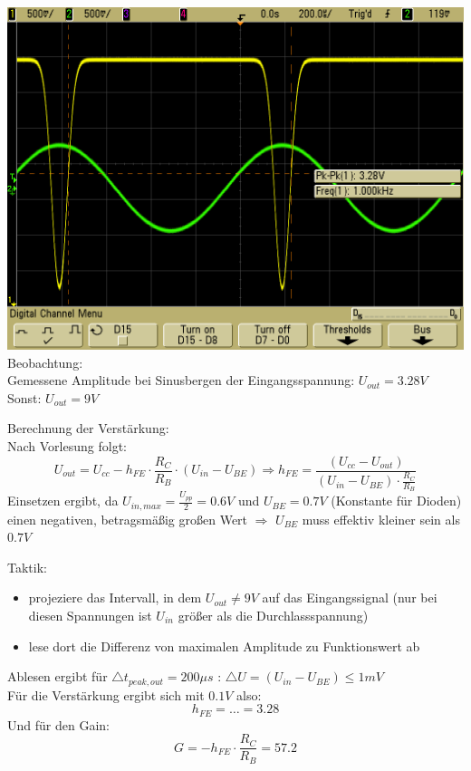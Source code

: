 \documentclass[compress,11pt]{beamer}
\begin{document}
\begin{frame}

\includegraphics[width=.7\textwidth]{../daten/oszi/scope_45}\\
Beobachtung:\\
Gemessene Amplitude bei Sinusbergen der Eingangsspannung: $U_{out} = 3.28 V$\\
Sonst: $U_{out} = 9 V$
\end{frame}
\begin{frame}
Berechnung der Verstärkung:\\
Nach Vorlesung folgt:
\begin{equation}
U_{out} = U_{cc} - h_{FE} \cdot \frac{R_C}{R_B} \cdot (U_{in} - U_{BE}) \Rightarrow h_{FE} = \frac{(U_{cc} - U_{out})}{(U_{in} - U_{BE}) \cdot \frac{R_C}{R_B}}
\end{equation}
Einsetzen ergibt, da $U_{in,max} = \frac{U_{pp}}{2} = 0.6 V$ und $U_{BE} = 0.7 V$ (Konstante für Dioden) einen negativen, betragsmäßig großen Wert $\Rightarrow$ $U_{BE}$ muss effektiv kleiner sein als $0.7 V$\\
\end{frame}
\begin{frame}

Taktik:
\begin{itemize}
\item projeziere das Intervall, in dem $U_{out} \neq 9 V$ auf das Eingangssignal (nur bei diesen Spannungen ist $U_{in}$ größer als die Durchlassspannung)
\item lese dort die Differenz von maximalen Amplitude zu Funktionswert ab
\end{itemize}


\end{frame}
\begin{frame}
Ablesen ergibt für $\bigtriangleup t_{peak,out} = 200 \mu s$ : $\bigtriangleup U = (U_{in} - U_{BE}) \leq 1 mV$ \\ Für die Verstärkung ergibt sich mit $0.1 V$ also:
\begin{equation}
h_{FE} = \dots 	= 3.28
\end{equation}
Und für den Gain:
\begin{equation}
G = -h_{FE} \cdot \frac{R_C}{R_B} = 57.2
\end{equation}
\end{frame}
\end{document}
